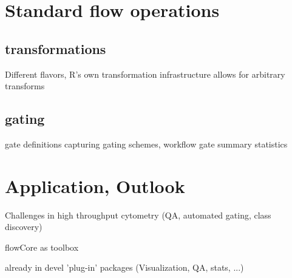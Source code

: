 \documentclass[12pt]{article}
\begin{document}
\section{Standard flow operations}
\subsection{transformations}
Different flavors, R's own transformation infrastructure allows for
arbitrary transforms

\subsection{gating}
gate definitions
capturing gating schemes, workflow
gate summary statistics


\section{Application, Outlook}
Challenges in high throughput cytometry
(QA, automated gating, class discovery) 

flowCore as toolbox

already in devel 'plug-in' packages (Visualization, QA, stats, ...)
\end{document}
